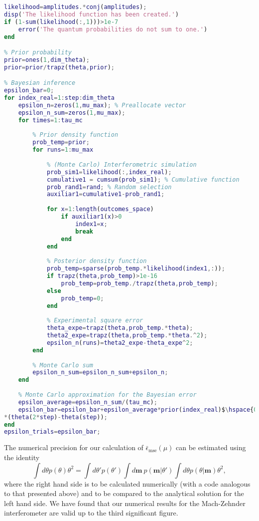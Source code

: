 \begin{lstlisting}[language=Matlab, mathescape=true]
% Likelihood function
likelihood=amplitudes.*conj(amplitudes);
disp('The likelihood function has been created.')
if (1-sum(likelihood(:,1)))>1e-7
    error('The quantum probabilities do not sum to one.')
end

% Prior probability
prior=ones(1,dim_theta);
prior=prior/trapz(theta,prior);

% Bayesian inference
epsilon_bar=0;
for index_real=1:step:dim_theta
    epsilon_n=zeros(1,mu_max); % Preallocate vector
    epsilon_n_sum=zeros(1,mu_max);
    for times=1:tau_mc
        
        % Prior density function
        prob_temp=prior;
        for runs=1:mu_max
            
            % (Monte Carlo) Interferometric simulation
            prob_sim1=likelihood(:,index_real);
            cumulative1 = cumsum(prob_sim1); % Cumulative function
            prob_rand1=rand; % Random selection
            auxiliar1=cumulative1-prob_rand1;
           
            for x=1:length(outcomes_space)
                if auxiliar1(x)>0
                    index1=x;
                    break
                end
            end
            
            % Posterior density function
            prob_temp=sparse(prob_temp.*likelihood(index1,:));
            if trapz(theta,prob_temp)>1e-16
                prob_temp=prob_temp./trapz(theta,prob_temp);
            else
                prob_temp=0;
            end
            
            % Experimental square error
            theta_expe=trapz(theta,prob_temp.*theta);
            theta2_expe=trapz(theta,prob_temp.*theta.^2);
            epsilon_n(runs)=theta2_expe-theta_expe^2;    
        end
        
        % Monte Carlo sum
        epsilon_n_sum=epsilon_n_sum+epsilon_n;
    end
       
    % Monte Carlo approximation for the Bayesian error
    epsilon_average=epsilon_n_sum/(tau_mc);
    epsilon_bar=epsilon_bar+epsilon_average*prior(index_real)$\hspace{0.15em}\swarrow$
*(theta(2*step)-theta(step));
end
epsilon_trials=epsilon_bar;
\end{lstlisting}

The numerical precision for our calculation of $\bar{\epsilon}_{\mathrm{mse}}(\mu)$ can be estimated using the identity
\begin{equation}
\int d\theta p(\theta) \theta^2 = \int d\theta' p(\theta') \int d\boldsymbol{m}~ p(\boldsymbol{m}|\theta') \int d\theta p(\theta|\boldsymbol{m})\theta^2,
\end{equation}
where the right hand side is to be calculated numerically (with a code analogous to that presented above) and to be compared to the analytical solution for the left hand side. We have found that our numerical results for the Mach-Zehnder interferometer are valid up to the third significant figure.  